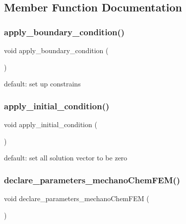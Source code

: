 \subsection{Member Function Documentation}
\mbox{\label{classmechano_chem_f_e_m_a668a12cfbc07238b37e8d202dc4ab3f6}} 
\subsubsection{\texorpdfstring{apply\_boundary\_condition()}{apply\_boundary\_condition()}}
{\footnotesize\ttfamily void apply\+\_\+boundary\+\_\+condition (\begin{DoxyParamCaption}{ }\end{DoxyParamCaption})\hspace{0.3cm}{\ttfamily [virtual]}}

default\+: set up constrains \mbox{\label{classmechano_chem_f_e_m_a8d32e81a32f1aaf5682065458548e8e2}} 
\subsubsection{\texorpdfstring{apply\_initial\_condition()}{apply\_initial\_condition()}}
{\footnotesize\ttfamily void apply\+\_\+initial\+\_\+condition (\begin{DoxyParamCaption}{ }\end{DoxyParamCaption})\hspace{0.3cm}{\ttfamily [virtual]}}

default\+: set all solution vector to be zero \mbox{\label{classmechano_chem_f_e_m_aa745c884c3343abacbffa4669a72488d}} 
\subsubsection{\texorpdfstring{declare\_parameters\_mechanoChemFEM()}{declare\_parameters\_mechanoChemFEM()}}
{\footnotesize\ttfamily void declare\+\_\+parameters\+\_\+mechano\+Chem\+F\+EM (\begin{DoxyParamCaption}{ }\end{DoxyParamCaption})}


